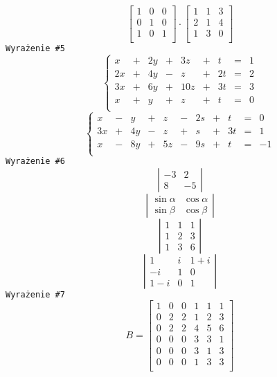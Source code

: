\documentclass[12pt]{article}
\begin{document}
$$
\left[
\begin{array}{ccc}
1 & 0 & 0 \\
0 & 1 & 0 \\
1 & 0 & 1 \\
\end{array}
\right]
\cdot 
\left[
\begin{array}{ccc}
1 & 1 & 3 \\
2 & 1 &4  \\
1 & 3 & 0 \\
\end{array}
\right]
$$
\texttt{Wyrażenie \#5}
$$
\left\{
\begin{array}{rcrcrcrcr}
x&+  & 2y & + & 3z & +& t&= & 1 \\
2x& + & 4y & - & z & +&2t&= & 2 \\
3x& + & 6y & + & 10z & + & 3t&= & 3 \\
x& + & y & + & z & +&t&= & 0 \\
\end{array}
\right.
$$
$$
\left\{
\begin{array}{rcrcrcrcrcr}
x&-  & y & + & z &  - &2s&+& t&= & 0 \\
3x& + & 4y & - & z & +&s&+&3t&= & 1 \\
x& - & 8y & + & 5z & - &9s&+& t&= & -1 \\
\end{array}
\right.
$$
\texttt{Wyrażenie \#6}
$$
\left|
\begin{array}{rr}
-3 & 2 \\
8 & -5 
\end{array}
\right|
$$
$$
\left|
\begin{array}{rr}
\sin \alpha & \cos \alpha \\
\sin \beta & \cos \beta 
\end{array}
\right|
$$
$$
\left|
\begin{array}{ccc}
1& 1& 1 \\
1 & 2& 3\\
1& 3 & 6 
\end{array}
\right|
$$
$$
\left|
\begin{array}{ccc}
1& i& 1+i \\
-i & 1& 0\\
1-i& 0 & 1 
\end{array}
\right|
$$
\texttt{Wyrażenie \#7}
$$
B=
\left[
\begin{array}{c|cc|ccc}
1& 0 & 0 & 1 & 1& 1\\
\hline 
0 & 2 & 2 & 1 & 2 & 3\\
0 & 2 & 2 & 4 & 5 & 6\\
\hline
0& 0 & 0 & 3 & 3& 1\\
0& 0 & 0 & 3 & 1& 3\\
0& 0 & 0 & 1 & 3& 3\\
\end{array}
\right]
$$
\end{document}
